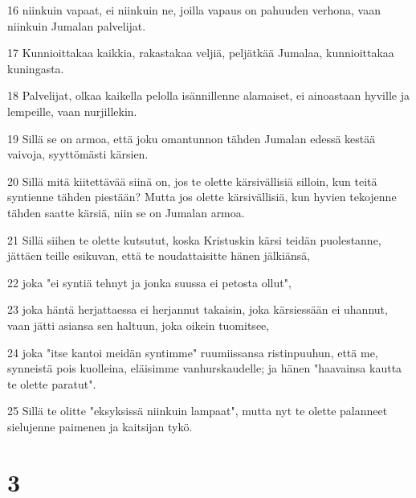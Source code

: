 \par 16 niinkuin vapaat, ei niinkuin ne, joilla vapaus on pahuuden verhona, vaan niinkuin Jumalan palvelijat.
\par 17 Kunnioittakaa kaikkia, rakastakaa veljiä, peljätkää Jumalaa, kunnioittakaa kuningasta.
\par 18 Palvelijat, olkaa kaikella pelolla isännillenne alamaiset, ei ainoastaan hyville ja lempeille, vaan nurjillekin.
\par 19 Sillä se on armoa, että joku omantunnon tähden Jumalan edessä kestää vaivoja, syyttömästi kärsien.
\par 20 Sillä mitä kiitettävää siinä on, jos te olette kärsivällisiä silloin, kun teitä syntienne tähden piestään? Mutta jos olette kärsivällisiä, kun hyvien tekojenne tähden saatte kärsiä, niin se on Jumalan armoa.
\par 21 Sillä siihen te olette kutsutut, koska Kristuskin kärsi teidän puolestanne, jättäen teille esikuvan, että te noudattaisitte hänen jälkiänsä,
\par 22 joka "ei syntiä tehnyt ja jonka suussa ei petosta ollut",
\par 23 joka häntä herjattaessa ei herjannut takaisin, joka kärsiessään ei uhannut, vaan jätti asiansa sen haltuun, joka oikein tuomitsee,
\par 24 joka "itse kantoi meidän syntimme" ruumiissansa ristinpuuhun, että me, synneistä pois kuolleina, eläisimme vanhurskaudelle; ja hänen "haavainsa kautta te olette paratut".
\par 25 Sillä te olitte "eksyksissä niinkuin lampaat", mutta nyt te olette palanneet sielujenne paimenen ja kaitsijan tykö.

\chapter{3}

